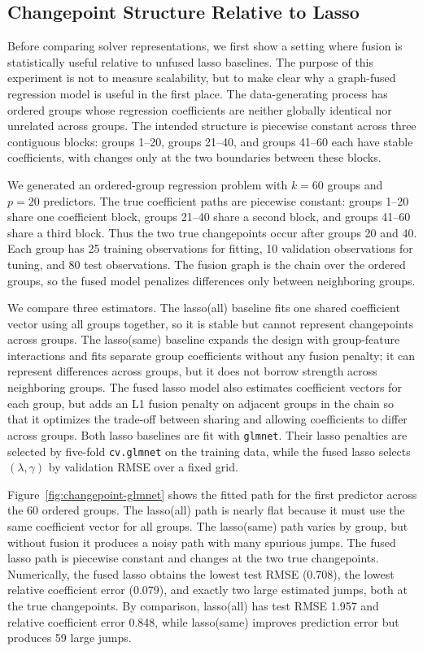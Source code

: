 \documentclass[twoside,11pt]{article}
\begin{document}
\subsection{Changepoint Structure Relative to Lasso}

Before comparing solver representations, we first show a setting where fusion
is statistically useful relative to unfused lasso baselines. 
The purpose of this experiment is not to measure scalability, but to make clear
why a graph-fused regression model is useful in the first place. 
The data-generating process has ordered groups whose regression coefficients
are neither globally identical nor unrelated across groups. 
The intended structure is piecewise constant across three contiguous blocks: groups
1--20, groups 21--40, and groups 41--60 each have stable coefficients, with
changes only at the two boundaries between these blocks.

We generated an ordered-group regression problem with $k=60$ groups and
$p=20$ predictors. 
The true coefficient paths are piecewise constant: groups 1--20 share one
coefficient block, groups 21--40 share a second block, and groups 41--60
share a third block. 
Thus the two true changepoints occur after groups 20 and 40. 
Each group has 25 training observations for fitting, 10 validation observations
for tuning, and 80 test observations. 
The fusion graph is the chain over the ordered groups, so the fused model
penalizes differences only between neighboring groups.

We compare three estimators. 
The lasso(all) baseline fits one shared coefficient vector using all groups
together, so it is stable but cannot represent changepoints across groups. 
The lasso(same) baseline expands the design with group-feature interactions and
fits separate group coefficients without any fusion penalty; it can represent
differences across groups, but it does not borrow strength across neighboring
groups. 
The fused lasso model also estimates coefficient vectors for each group, but
adds an L1 fusion penalty on adjacent groups in the chain so that it optimizes
the trade-off between sharing and allowing coefficients to differ across
groups. 
Both lasso baselines are fit with \texttt{glmnet}. 
Their lasso penalties are selected by five-fold \texttt{cv.glmnet} on the
training data, while the fused lasso selects $(\lambda,\gamma)$ by validation
RMSE over a fixed grid.

Figure~\ref{fig:changepoint-glmnet} shows the fitted path for the first
predictor across the 60 ordered groups. 
The lasso(all) path is nearly flat because it must use the same coefficient
vector for all groups. 
The lasso(same) path varies by group, but without fusion it produces a noisy
path with many spurious jumps. 
The fused lasso path is piecewise constant and changes at the two true
changepoints. 
Numerically, the fused lasso obtains the lowest test RMSE (0.708), the lowest
relative coefficient error (0.079), and exactly two large estimated jumps,
both at the true changepoints. 
By comparison, lasso(all) has test RMSE 1.957 and relative coefficient error
0.848, while lasso(same) improves prediction error but produces 59 large
jumps.
\end{document}
